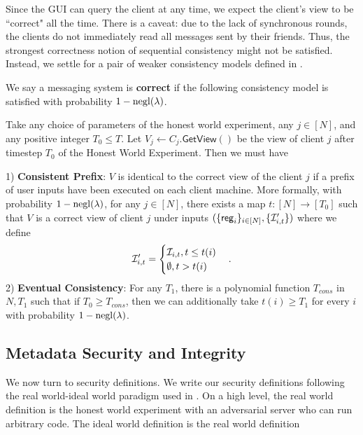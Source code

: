 Since the GUI can query the client at any time, we expect the client's view to be ``correct" all the time. There is a caveat: due to the lack of synchronous rounds, the clients do not immediately read all messages sent by their friends. Thus, the strongest correctness notion of sequential consistency might not be satisfied. Instead, we settle for a pair of weaker consistency models defined in \cite{doug13Consistency}. 
\begin{definition}[Correctness]
\label{defn:correctness}
 We say a messaging system is \textbf{correct} if the following consistency model is satisfied with probability $1 - \operatorname{negl}(\lambda)$.
 
 Take any choice of parameters of the honest world experiment, any $j \in [N]$, and any positive integer $T_0 \leq T$. Let $V_j \leftarrow C_j.\mathsf{GetView}()$ be the view of client $j$ after timestep $T_0$ of the Honest World Experiment. Then we must have

1) \textbf{Consistent Prefix}: $V$ is identical to the correct view of the client $j$ if a prefix of user inputs have been executed on each client machine. More formally, with probability $1 - \operatorname{negl}(\lambda)$, for any $j \in [N]$, there exists a map $t: [N] \to [T_0]$ such that  $V$ is a correct view of client $j$ under inputs $(\{\mathsf{reg}_i\}_{i \in [N]}, \{\mathcal{I}'_{i, t}\})$
where we define
$$\mathcal{I}'_{i, t} = \begin{cases}
\mathcal{I}_{i, t}, t \leq t(i) \\
\emptyset, t > t(i)
\end{cases}.$$
2) \textbf{Eventual Consistency}: For any $T_1$, there is a polynomial function $T_{cons}$ in $N, T_1$ such that if $T_0 \geq T_{cons}$, then we can additionally take $t(i) \geq T_1$ for every $i$ with probability $1 - \operatorname{negl}(\lambda)$.
\end{definition}

\subsection{Metadata Security and Integrity}
We now turn to security definitions. We write our security definitions following the real world-ideal world paradigm used in \cite{shi2021non}. On a high level, the real world definition is the honest world experiment with an adversarial server who can run arbitrary code. The ideal world definition is the real world definition

